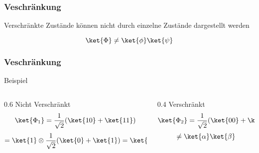 \begin{frame}
    \frametitle{Veschränkung}
    
    Verschränkte Zustände können nicht durch einzelne Zustände dargestellt werden

    \hfil

    $$\ket{\Phi} \neq \ket{\phi} \ket{\psi}$$

\end{frame}

\begin{frame}
    \frametitle{Veschränkung}
    Beispiel

    \hfil

    \begin{columns}[c]
        \begin{column}{0.6\hsize}\centering
        Nicht Verschränkt
        $$\ket{\Phi_1} = \frac{1}{\sqrt{2}} ( \ket{10} + \ket{11})$$
        $$= \ket{1}\otimes \frac{1}{\sqrt{2}} ( \ket{0} + \ket{1})= \ket{1} \ket{+}$$
        \end{column}

        \begin{column}{0.4\hsize}
        Verschränkt
        $$\ket{\Phi_2} = \frac{1}{\sqrt{2}} ( \ket{00} + \ket{11})$$
        $$\neq \ket{\alpha}\ket{\beta}$$

        \end{column}
    \end{columns}

\end{frame}